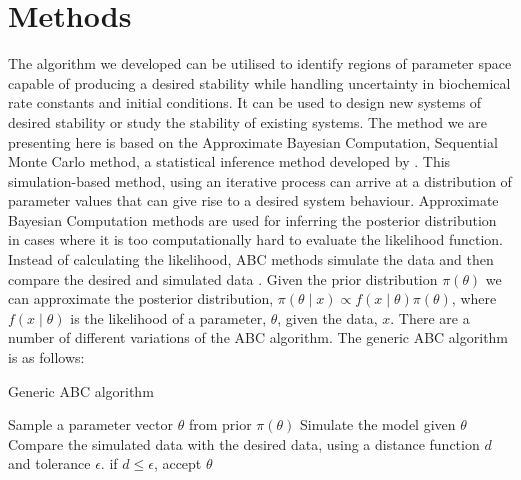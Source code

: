 \section{Methods}

The algorithm we developed can be utilised to identify regions of parameter space capable of producing a desired stability while handling uncertainty in biochemical rate constants and initial conditions. It can be used to design new systems of desired stability or study the stability of existing systems. The method we are presenting here is based on the Approximate Bayesian Computation, Sequential Monte Carlo method, a statistical inference method developed by \textcite{Toni:2009tr}. This simulation-based method, using an iterative process can arrive at a distribution of parameter values that can give rise to a desired system behaviour. 
Approximate Bayesian Computation methods are used for inferring the posterior distribution in cases where it is too computationally hard to evaluate the likelihood function. Instead of calculating the likelihood, ABC methods simulate the data and then compare the desired and simulated data \autocite{Toni:2009tr}. Given the prior distribution $\pi(\theta)$ we can approximate the posterior distribution, $\pi(\theta\mid x)\propto f(x\mid\theta)\pi(\theta)$, where $f(x\mid\theta)$ is the likelihood of a parameter, $\theta$, given the data, $x$. There are a number of different variations of the ABC algorithm. The generic ABC algorithm is as follows:
	
	\begin{algorithm}[h]
	\label{alg:ABCr}
  \caption{Generic ABC algorithm}
 \begin{algorithmic}[1]
    \Statex
	\State Sample a parameter vector $\theta$ from prior $\pi(\theta)$
	\State Simulate the model given $\theta$
    \State Compare the simulated data with the desired data, using a distance function $d$ and tolerance $\epsilon$. if $d \leq \epsilon$, accept $\theta$ 
   
  \end{algorithmic}
\end{algorithm}


